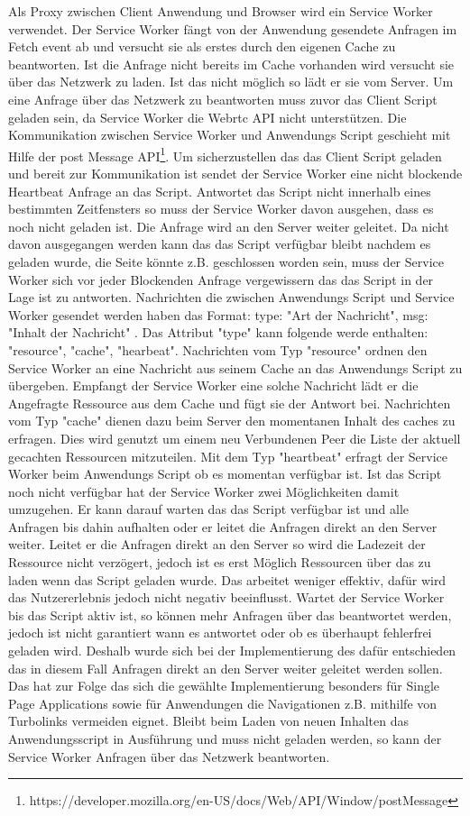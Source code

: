 Als Proxy zwischen Client Anwendung und Browser wird ein Service Worker verwendet. Der Service Worker fängt von der Anwendung gesendete Anfragen im Fetch event ab und versucht sie als erstes durch den eigenen Cache zu beantworten. Ist die Anfrage nicht bereits im Cache vorhanden wird versucht sie über das \pTp Netzwerk zu laden. Ist das nicht möglich so lädt er sie vom Server. 
Um eine Anfrage über das \pTp Netzwerk zu beantworten muss zuvor das Client Script geladen sein, da Service Worker die Webrtc API nicht unterstützen. Die Kommunikation zwischen Service Worker und Anwendungs Script geschieht mit Hilfe der post Message API\footnote{https://developer.mozilla.org/en-US/docs/Web/API/Window/postMessage}. Um sicherzustellen das das Client Script geladen und bereit zur Kommunikation ist sendet der Service Worker eine nicht blockende Heartbeat Anfrage an das Script. Antwortet das Script nicht innerhalb eines bestimmten Zeitfensters so muss der Service Worker davon ausgehen, dass es noch nicht geladen ist. Die Anfrage wird an den Server weiter geleitet. Da nicht davon ausgegangen werden kann das das Script verfügbar bleibt nachdem es geladen wurde, die Seite könnte z.B. geschlossen worden sein, muss der Service Worker sich vor jeder Blockenden Anfrage vergewissern das das Script in der Lage ist zu antworten.
Nachrichten die zwischen Anwendungs Script und Service Worker gesendet werden haben das Format: { type: "Art der Nachricht", msg: "Inhalt der Nachricht" }. Das Attribut "type" kann folgende werde enthalten: "resource", "cache", "hearbeat". Nachrichten vom Typ "resource" ordnen den Service Worker an eine Nachricht aus seinem Cache an das Anwendungs Script zu übergeben. Empfangt der Service Worker eine solche Nachricht lädt er die Angefragte Ressource aus dem Cache und fügt sie der Antwort bei. Nachrichten vom Typ "cache" dienen dazu beim Server den momentanen Inhalt des caches zu erfragen. Dies wird genutzt um einem neu Verbundenen Peer die Liste der aktuell gecachten Ressourcen mitzuteilen. Mit dem Typ "heartbeat" erfragt der Service Worker beim Anwendungs Script ob es momentan verfügbar ist.   
Ist das Script noch nicht verfügbar hat der Service Worker zwei Möglichkeiten damit umzugehen. Er kann darauf warten das das Script verfügbar ist und alle Anfragen bis dahin aufhalten oder er leitet die Anfragen direkt an den Server weiter. Leitet er die Anfragen direkt an den Server so wird die Ladezeit der Ressource nicht verzögert, jedoch ist es erst Möglich Ressourcen über das \pTp \cdn zu laden wenn das Script geladen wurde. Das \cdn arbeitet weniger effektiv, dafür wird das Nutzererlebnis jedoch nicht negativ beeinflusst. Wartet der Service Worker bis das Script aktiv ist, so können mehr Anfragen über das \cdn beantwortet werden, jedoch ist nicht garantiert wann es antwortet oder ob es überhaupt fehlerfrei geladen wird. Deshalb wurde sich bei der Implementierung des \cdns dafür entschieden das in diesem Fall Anfragen direkt an den Server weiter geleitet werden sollen. Das hat zur Folge das sich die gewählte Implementierung besonders für Single Page Applications sowie für Anwendungen die Navigationen z.B. mithilfe von Turbolinks vermeiden eignet. Bleibt beim Laden von neuen Inhalten das Anwendungsscript in Ausführung und muss nicht geladen werden, so kann der Service Worker Anfragen über das \pTp Netzwerk beantworten.
